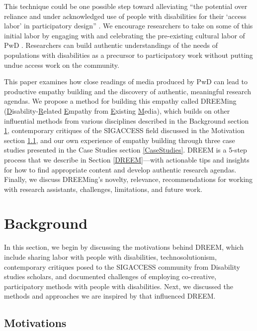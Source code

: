 This technique could be one possible step toward alleviating ``the potential over reliance and under acknowledged use of people with disabilities for their `access labor' in participatory design'' \cite{mackWhatWeMean2021,bennettBiographicalPrototypesReimagining2019}.
We encourage researchers to take on some of this initial labor by engaging with and celebrating the pre-existing cultural labor of PwD \cite{piepzna-samarasinhaCareWorkDreaming2018}. Researchers can build authentic understandings of the needs of populations with disabilities as a precursor to participatory work without putting undue access work on the community.  

This paper examines how close readings of media produced by PwD can lead to productive empathy building and the discovery of authentic, meaningful research agendas. We propose a method for building this empathy called DREEMing (\underline{D}isability-\underline{R}elated \underline{E}mpathy from \underline{E}xisting \underline{M}edia), which builds on other influential methods from various disciplines described in the Background section \ref{Background}, contemporary critiques of the SIGACCESS field discussed in the Motivation section \ref{Motivations}, and our own experience of empathy building through {\color{red}three} case studies presented in the Case Studies section \ref{CaseStudies}. DREEM is a 5-step process that we describe in Section \ref{DREEM}—with actionable tips and insights for how to find appropriate content and develop authentic research agendas. Finally, we discuss DREEMing's novelty, relevance, recommendations for working with research assistants, challenges, limitations, and future work.


\section{Background} \label{Background}
 In this section, we begin by discussing the motivations behind DREEM, which include sharing labor with people with disabilities, technosolutionism, contemporary critiques posed to the SIGACCESS community from Disability studies scholars, and documented challenges of employing co-creative, participatory methods with people with disabilities. Next, we discussed the methods and approaches we are inspired by that influenced DREEM. 

\subsection{Motivations}\label{Motivations}

